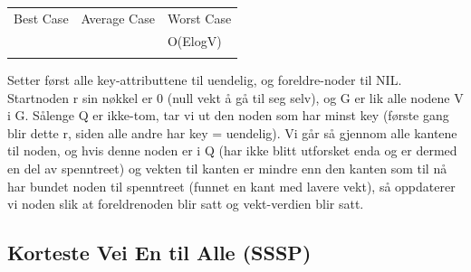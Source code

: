 \documentclass[12pt]{report}
\begin{document}
{\fontsize{18pt}{21.6pt}\selectfont \textcolor[HTML]{353535}{ }\par}\par


\vspace{\baselineskip}




\begin{table}[H]
 			\centering
\begin{tabular}{p{1.75in}p{2.41in}p{1.91in}}
\hline
\multicolumn{1}{p{1.75in}}{{\fontsize{13pt}{15.6pt}\selectfont Best Case}} & 
\multicolumn{1}{p{2.41in}}{{\fontsize{13pt}{15.6pt}\selectfont Average Case}} & 
\multicolumn{1}{p{1.91in}}{{\fontsize{13pt}{15.6pt}\selectfont Worst Case}} \\
\hhline{---}
\multicolumn{1}{p{1.75in}}{} & 
\multicolumn{1}{p{2.41in}}{} & 
\multicolumn{1}{p{1.91in}}{{\fontsize{14pt}{16.8pt}\selectfont O(ElogV)}} \\
\hhline{---}

\end{tabular}
 \end{table}




\vspace{\baselineskip}
Setter først alle key-attributtene til uendelig, og foreldre-noder til NIL. Startnoden r sin nøkkel er 0 (null vekt å gå til seg selv), og G er lik alle nodene V i G. Sålenge Q er ikke-tom, tar vi ut den noden som har minst key (første gang blir dette r, siden alle andre har key = uendelig). Vi går så gjennom alle kantene til noden, og hvis denne noden er i Q (har ikke blitt utforsket enda og er dermed en del av spenntreet) og vekten til kanten er mindre enn den kanten som til nå har bundet noden til spenntreet (funnet en kant med lavere vekt), så oppdaterer vi noden slik at foreldrenoden blir satt og vekt-verdien blir satt. \par

\setlength{\parskip}{6.0pt}

\vspace{\baselineskip}
\vspace{\baselineskip}
\subsection*{Korteste Vei En til Alle (SSSP)}
\end{document}
